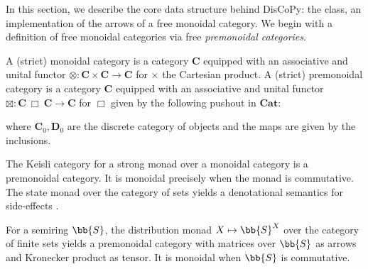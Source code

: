 
In this section, we describe the core data structure behind DisCoPy:
the  class, an implementation of the arrows of a free
monoidal category. We begin with a definition of free monoidal categories via
free \emph{premonoidal categories}.

\begin{definition}\label{definition-1}
A (strict) monoidal category is a category $\mathbf{C}$ equipped with an associative
and unital functor $\otimes : \mathbf{C} \times \mathbf{C} \to \mathbf{C}$ for $\times$
the Cartesian product.
A (strict) premonoidal category is a category $\mathbf{C}$ equipped with an
associative and unital functor $\boxtimes : \mathbf{C} \ \Box \ \mathbf{C} \to \mathbf{C}$
for $\Box$ given by the following pushout in $\mathbf{Cat}$:

where $\mathbf{C}_0, \mathbf{D}_0$ are the discrete category of objects and the maps are given by the inclusions.
\end{definition}

\begin{example}\label{example-2}
The Keisli category for a strong monad over a monoidal category is a
premonoidal category. It is monoidal precisely when the monad is commutative.
The state monad over the category of sets yields a denotational
semantics for side-effects \cite{PowerRobinson97}.
\end{example}

\begin{example}
For a semiring $\bb{S}$, the distribution monad $X \mapsto \bb{S}^X$ over the
category of finite sets yields a premonoidal category with matrices over $\bb{S}$ as arrows and Kronecker product as tensor. It is monoidal when $\bb{S}$ is commutative.
\end{example}

